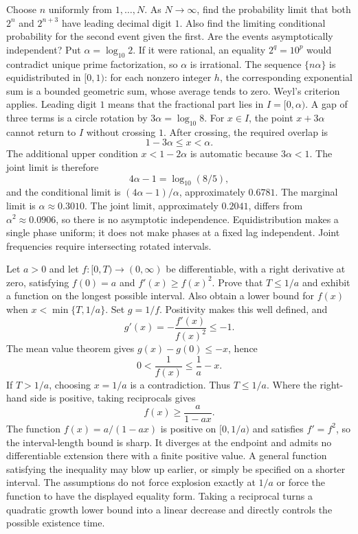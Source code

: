 Choose $n$ uniformly from $1,\ldots,N$. As $N\to\infty$, find the probability limit that both $2^n$ and $2^{n+3}$ have leading decimal digit $1$. Also find the limiting conditional probability for the second event given the first. Are the events asymptotically independent?
\solution Put $\alpha=\log_{10}2$. If it were rational, an equality $2^q=10^p$ would contradict unique prime factorization, so $\alpha$ is irrational. The sequence $\{n\alpha\}$ is equidistributed in $[0,1)$: for each nonzero integer $h$, the corresponding exponential sum is a bounded geometric sum, whose average tends to zero. Weyl's criterion applies.
Leading digit $1$ means that the fractional part lies in $I=[0,\alpha)$. A gap of three terms is a circle rotation by $3\alpha=\log_{10}8$. For $x\in I$, the point $x+3\alpha$ cannot return to $I$ without crossing $1$. After crossing, the required overlap is
\[
 1-3\alpha\le x<\alpha.
\]
The additional upper condition $x<1-2\alpha$ is automatic because $3\alpha<1$. The joint limit is therefore
\[
 4\alpha-1=\log_{10}(8/5),
\]
and the conditional limit is $(4\alpha-1)/\alpha$, approximately $0.6781$. The marginal limit is $\alpha\approx0.3010$. The joint limit, approximately $0.2041$, differs from $\alpha^2\approx0.0906$, so there is no asymptotic independence.
\insight Equidistribution makes a single phase uniform; it does not make phases at a fixed lag independent. Joint frequencies require intersecting rotated intervals.

Let $a>0$ and let $f:[0,T)\to(0,\infty)$ be differentiable, with a right derivative at zero, satisfying $f(0)=a$ and $f'(x)\ge f(x)^2$. Prove that $T\le1/a$ and exhibit a function on the longest possible interval. Also obtain a lower bound for $f(x)$ when $x<\min\{T,1/a\}$.
\solution Set $g=1/f$. Positivity makes this well defined, and
\[
 g'(x)=-\frac{f'(x)}{f(x)^2}\le-1.
\]
The mean value theorem gives $g(x)-g(0)\le-x$, hence
\[
 0<\frac1{f(x)}\le\frac1a-x.
\]
If $T>1/a$, choosing $x=1/a$ is a contradiction. Thus $T\le1/a$. Where the right-hand side is positive, taking reciprocals gives
\[
 f(x)\ge\frac{a}{1-ax}.
\]
The function $f(x)=a/(1-ax)$ is positive on $[0,1/a)$ and satisfies $f'=f^2$, so the interval-length bound is sharp. It diverges at the endpoint and admits no differentiable extension there with a finite positive value.
A general function satisfying the inequality may blow up earlier, or simply be specified on a shorter interval. The assumptions do not force explosion exactly at $1/a$ or force the function to have the displayed equality form.
\insight Taking a reciprocal turns a quadratic growth lower bound into a linear decrease and directly controls the possible existence time.

